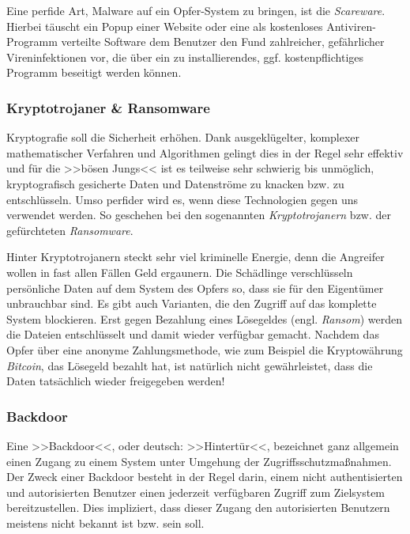 Eine perfide Art, Malware auf ein Opfer-System zu bringen, ist die \textit{Scareware}. Hierbei täuscht ein Popup einer Website oder eine als kostenloses Antiviren-Programm verteilte Software dem Benutzer den Fund zahlreicher, gefährlicher Vireninfektionen vor, die über ein zu installierendes, ggf. kostenpflichtiges Programm beseitigt werden können.


\subsubsection{Kryptotrojaner \& Ransomware}
\label{sec:Ransomware}

Kryptografie soll die Sicherheit erhöhen. Dank ausgeklügelter, komplexer mathematischer Verfahren und Algorithmen gelingt dies in der Regel sehr effektiv und für die >>bösen Jungs<< ist es teilweise sehr schwierig bis unmöglich, kryptografisch gesicherte Daten und Datenströme zu knacken bzw. zu entschlüsseln. Umso perfider wird es, wenn diese Technologien gegen uns verwendet werden. So geschehen bei den sogenannten \textit{Kryptotrojanern} bzw. der gefürchteten \textit{Ransomware}.

Hinter Kryptotrojanern steckt sehr viel kriminelle Energie, denn die Angreifer wollen in fast allen Fällen Geld ergaunern. Die Schädlinge verschlüsseln persönliche Daten auf dem System des Opfers so, dass sie für den Eigentümer unbrauchbar sind. Es gibt auch Varianten, die den Zugriff auf das komplette System blockieren. Erst gegen Bezahlung eines Lösegeldes (engl. \textit{Ransom}) werden die Dateien entschlüsselt und damit wieder verfügbar gemacht. Nachdem das Opfer über eine anonyme Zahlungsmethode, wie zum Beispiel die Kryptowährung \textit{Bitcoin}, das Lösegeld bezahlt hat, ist natürlich nicht gewährleistet, dass die Daten tatsächlich wieder freigegeben werden!

\subsubsection{Backdoor}
\label{sec:Backdoor}

Eine >>Backdoor<<, oder deutsch: >>Hintertür<<, bezeichnet ganz allgemein einen Zugang zu einem System unter Umgehung der Zugriffsschutzmaßnahmen. Der Zweck einer Backdoor besteht in der Regel darin, einem nicht authentisierten und autorisierten Benutzer einen jederzeit verfügbaren Zugriff zum Zielsystem bereitzustellen. Dies impliziert, dass dieser Zugang den autorisierten Benutzern meistens nicht bekannt ist bzw. sein soll.


